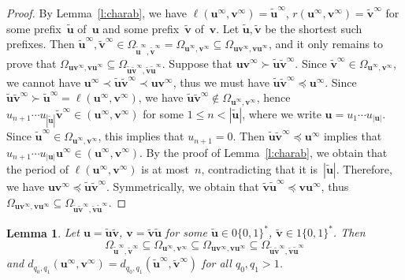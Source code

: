 \documentclass{amsart}
\newtheorem{lemma}[theorem]{Lemma}
\theoremstyle{definition}
\numberwithin{equation}{section}
\newcommand{\bu}{\mathbf{u}}
\newcommand{\bv}{\mathbf{v}}
\begin{document}
\begin{proof}
By Lemma~\ref{l:charab}, we have $\ell(\bu^\infty,\bv^\infty) = \tilde{\bu}^\infty$, $r(\bu^\infty,\bv^\infty) = \tilde{\bv}^\infty$ for some prefix~$\tilde{\bu}$ of~$\bu$ and some prefix~$\tilde{\bv}$ of~$\bv$.
Let $\tilde{\bu}, \tilde{\bv}$ be the shortest such prefixes.
Then $\tilde{\bu}^\infty, \tilde{\bv}^\infty \in \Omega_{\tilde{\bu}^\infty,\tilde{\bv}^\infty} = \Omega_{\bu^\infty,\bv^\infty} \subseteq \Omega_{\bu\bv^\infty,\bv\bu^\infty}$, and it only remains to prove that $\Omega_{\bu\bv^\infty,\bv\bu^\infty} \subseteq \Omega_{\tilde{\bu}\tilde{\bv}^\infty,\tilde{\bv}\tilde{\bu}^\infty}$.
Suppose that $\bu\bv^\infty \succ \tilde{\bu} \tilde{\bv}^\infty$.
Since $\tilde{\bv}^\infty \in \Omega_{\bu^\infty,\bv^\infty}$, we cannot have $\bu^\infty \prec \tilde{\bu} \tilde{\bv}^\infty \prec \bu\bv^\infty$, thus we must have $\tilde{\bu} \tilde{\bv}^\infty \preceq \bu^\infty$.
Since $\tilde{\bu} \tilde{\bv}^\infty \succ \tilde{\bu}^\infty = \ell(\bu^\infty,\bv^\infty)$, we have $\tilde{\bu} \tilde{\bv}^\infty \notin \Omega_{\bu^\infty,\bv^\infty}$, hence $u_{n+1} \cdots u_{|\tilde{\bu}|} \tilde{\bv}^\infty \in (\bu^\infty, \bv^\infty)$ for some $1 \le n < |\tilde{\bu}|$, where we write $\bu = u_1 \cdots u_{|\bu|}$.
Since $\tilde{\bu}^\infty \in \Omega_{\bu^\infty,\bv^\infty}$, this implies that $u_{n+1} = 0$.
Then $\tilde{\bu} \tilde{\bv}^\infty \preceq \bu^\infty$ implies that $u_{n+1} \cdots u_{|\bu|} \bu^\infty \in (\bu^\infty, \bv^\infty)$.
By the proof of Lemma~\ref{l:charab}, we obtain that the period of $\ell(\bu^\infty,\bv^\infty)$ is at most~$n$, contradicting that it is~$|\tilde{\bu}|$.
Therefore, we have $\bu\bv^\infty \preceq \tilde{\bu} \tilde{\bv}^\infty$.
Symmetrically, we obtain that $\tilde{\bv}\tilde{\bu}^\infty \preceq \bv\bu^\infty$, thus $\Omega_{\bu\bv^\infty,\bv\bu^\infty} \subseteq \Omega_{\tilde{\bu}\tilde{\bv}^\infty,\tilde{\bv}\tilde{\bu}^\infty}$.
\end{proof}

\begin{lemma} \label{l:notuvprime}
Let $\bu = \tilde{\bu}\tilde{\bv}$, $\bv = \tilde{\bv}\tilde{\bu}$ for some $\tilde{\bu} \in 0\{0,1\}^*$, $\tilde{\bv} \in 1\{0,1\}^*$.
Then
\begin{equation} \label{e:Omegauv}
\Omega_{\tilde{\bu}^\infty,\tilde{\bv}^\infty} \subseteq \Omega_{\bu^\infty,\bv^\infty} \subseteq \Omega_{\bu\bv^\infty,\bv\bu^\infty} \subseteq \Omega_{\tilde{\bu}\tilde{\bv}^\infty,\tilde{\bv}\tilde{\bu}^\infty}
\end{equation}
and 
$d_{q_0,q_1}(\bu^\infty,\bv^\infty) = d_{q_0,q_1}(\tilde{\bu}^\infty,\tilde{\bv}^\infty)$ for all $q_0,q_1 > 1$.
\end{lemma}
\end{document}
